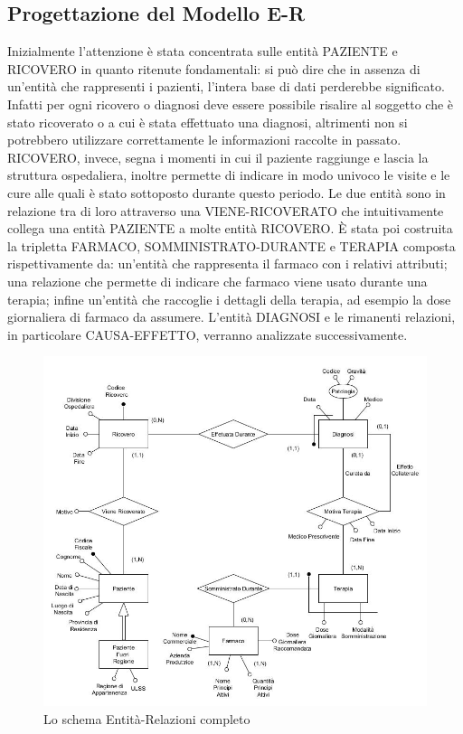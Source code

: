 \documentclass{article}
\begin{document}
\clearpage
\subsection{Progettazione del Modello E-R}
Inizialmente l'attenzione è stata concentrata sulle entità PAZIENTE e RICOVERO in quanto ritenute fondamentali: si può dire che in assenza di un'entità che rappresenti i pazienti, l'intera base di dati perderebbe significato.
Infatti per ogni ricovero o diagnosi deve essere possibile risalire al soggetto che è stato ricoverato o a cui è stata effettuato una diagnosi, altrimenti non si potrebbero utilizzare correttamente le informazioni raccolte in passato.
RICOVERO, invece, segna i momenti in cui il paziente raggiunge e lascia la struttura ospedaliera, inoltre permette di indicare in modo univoco le visite e le cure alle quali è stato sottoposto durante questo periodo.
Le due entità sono in relazione tra di loro attraverso una VIENE-RICOVERATO che intuitivamente collega una entità PAZIENTE a molte entità RICOVERO.
È stata poi costruita la tripletta FARMACO, SOMMINISTRATO-DURANTE e TERAPIA composta rispettivamente da: un'entità che rappresenta il farmaco con i relativi attributi; una relazione che permette di indicare che farmaco viene usato durante una terapia; infine un'entità che raccoglie i dettagli della terapia, ad esempio la dose giornaliera di farmaco da assumere.
L'entità DIAGNOSI e le rimanenti relazioni, in particolare CAUSA-EFFETTO, verranno analizzate successivamente.


\begin{figure} %
  \centering
  \includegraphics[width=\linewidth]{schema1}
  \caption{Lo schema Entità-Relazioni completo}
  \label{schema_ER_progettazione_modello}
\end{figure}
\end{document}
